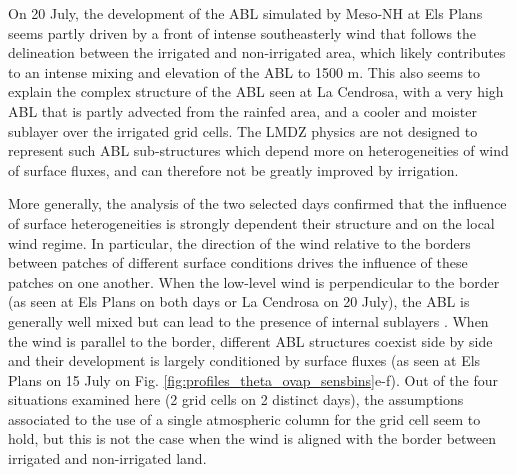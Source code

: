 On 20 July, the development of the ABL simulated by Meso-NH at Els Plans seems partly driven by a front of intense southeasterly wind that follows the delineation between the irrigated and non-irrigated area, which likely contributes to an intense mixing and elevation of the ABL to 1500 m. 
This also seems to explain the complex structure of the ABL seen at La Cendrosa, with a very high ABL that is partly advected from the rainfed area, and a cooler and moister sublayer over the irrigated grid cells. 
The LMDZ physics are not designed to represent such ABL sub-structures which depend more on heterogeneities of wind of surface fluxes, and can therefore not be greatly improved by irrigation.

More generally, the analysis of the two selected days confirmed that the influence of surface heterogeneities is strongly dependent their structure and on the local wind regime. 
In particular, the direction of the wind relative to the borders between patches of different surface conditions drives the influence of these patches on one another.
When the low-level wind is perpendicular to the border (as seen at Els Plans on both days or La Cendrosa on 20 July), the ABL is generally well mixed but can lead to the presence of internal sublayers \citep[as reviewed in][]{bou-zeid_persistent_2020}. When the wind is parallel to the border, different ABL structures coexist side by side and their development is largely conditioned by surface fluxes (as seen at Els Plans on 15 July on Fig. \ref{fig:profiles_theta_ovap_sensbins}e-f).
Out of the four situations examined here (2 grid cells on 2 distinct days), the assumptions associated to the use of a single atmospheric column for the grid cell seem to hold, but this is not the case when the wind is aligned with the border between irrigated and non-irrigated land.

\clearpage

